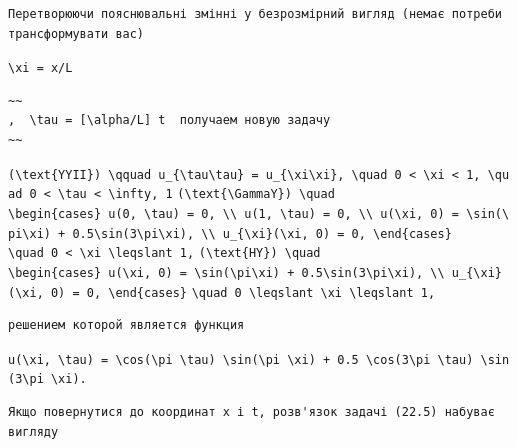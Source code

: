 \documentclass[
  ukrainian,
]{article}
\begin{document}
\begin{verbatim}
Перетворюючи пояснювальні змінні у безрозмірний вигляд (немає потреби трансформувати вас)
\end{verbatim}

\texttt{\textbackslash{}xi\ =\ x/L}

\begin{verbatim}
~~
,  \tau = [\alpha/L] t  получаем новую задачу
~~
\end{verbatim}

\texttt{(\textbackslash{}text\{YYII\})\ \textbackslash{}qquad\ u\_\{\textbackslash{}tau\textbackslash{}tau\}\ =\ u\_\{\textbackslash{}xi\textbackslash{}xi\},\ \textbackslash{}quad\ 0\ \textless{}\ \textbackslash{}xi\ \textless{}\ 1,\ \textbackslash{}quad\ 0\ \textless{}\ \textbackslash{}tau\ \textless{}\ \textbackslash{}infty,\ 1}
\texttt{(\textbackslash{}text\{\textbackslash{}GammaY\})\ \textbackslash{}quad}
\texttt{\textbackslash{}begin\{cases\}\ u(0,\ \textbackslash{}tau)\ =\ 0,\ \textbackslash{}\textbackslash{}\ u(1,\ \textbackslash{}tau)\ =\ 0,\ \textbackslash{}\textbackslash{}\ u(\textbackslash{}xi,\ 0)\ =\ \textbackslash{}sin(\textbackslash{}pi\textbackslash{}xi)\ +\ 0.5\textbackslash{}sin(3\textbackslash{}pi\textbackslash{}xi),\ \textbackslash{}\textbackslash{}\ u\_\{\textbackslash{}xi\}(\textbackslash{}xi,\ 0)\ =\ 0,\ \textbackslash{}end\{cases\}}
\texttt{\textbackslash{}quad\ 0\ \textless{}\ \textbackslash{}xi\ \textbackslash{}leqslant\ 1,}
\texttt{(\textbackslash{}text\{HY\})\ \textbackslash{}quad}
\texttt{\textbackslash{}begin\{cases\}\ u(\textbackslash{}xi,\ 0)\ =\ \textbackslash{}sin(\textbackslash{}pi\textbackslash{}xi)\ +\ 0.5\textbackslash{}sin(3\textbackslash{}pi\textbackslash{}xi),\ \textbackslash{}\textbackslash{}\ u\_\{\textbackslash{}xi\}(\textbackslash{}xi,\ 0)\ =\ 0,\ \textbackslash{}end\{cases\}}
\texttt{\textbackslash{}quad\ 0\ \textbackslash{}leqslant\ \textbackslash{}xi\ \textbackslash{}leqslant\ 1,}

\begin{verbatim}
решением которой является функция
\end{verbatim}

\texttt{u(\textbackslash{}xi,\ \textbackslash{}tau)\ =\ \textbackslash{}cos(\textbackslash{}pi\ \textbackslash{}tau)\ \textbackslash{}sin(\textbackslash{}pi\ \textbackslash{}xi)\ +\ 0.5\ \textbackslash{}cos(3\textbackslash{}pi\ \textbackslash{}tau)\ \textbackslash{}sin(3\textbackslash{}pi\ \textbackslash{}xi).}

\begin{verbatim}
Якщо повернутися до координат x і t, розв'язок задачі (22.5) набуває вигляду
\end{verbatim}
\end{document}
